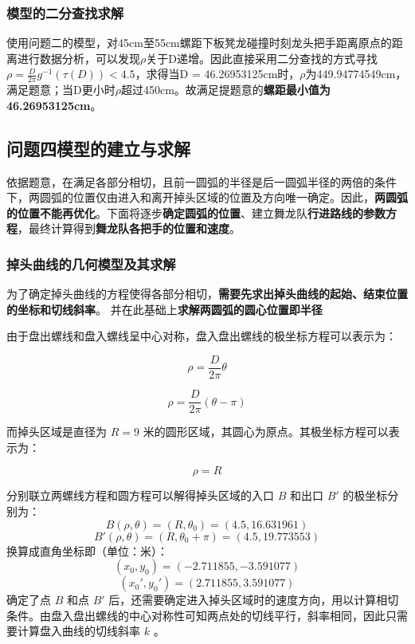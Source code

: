 \documentclass[a4paper]{article}
\begin{document}
        \subsubsection{模型的二分查找求解}
        使用问题二的模型，对45cm至55cm螺距下板凳龙碰撞时刻龙头把手距离原点的距离进行数据分析，可以发现$\rho$关于D递增。因此直接采用二分查找的方式寻找$\rho = \frac{D}{2 \pi} g^{-1}(\tau(D))< 4.5$，求得当D = 46.26953125cm时，$\rho$为449.94774549cm，满足题意；当D更小时$\rho$超过450cm。故满足提题意的\textbf{螺距最小值为46.26953125cm}。
	\subsection{问题四模型的建立与求解}

		依据题意，在满足各部分相切，且前一圆弧的半径是后一圆弧半径的两倍的条件下，两圆弧的位置仅由进入和离开掉头区域的位置及方向唯一确定。因此，\textbf{两圆弧的位置不能再优化}。下面将逐步\textbf{确定圆弧的位置}、建立舞龙队\textbf{行进路线的参数方程}，最终计算得到\textbf{舞龙队各把手的位置和速度}。%

		\subsubsection{掉头曲线的几何模型及其求解}

		为了确定掉头曲线的方程使得各部分相切，\textbf{需要先求出掉头曲线的起始、结束位置的坐标和切线斜率}。
		并在此基础上\textbf{求解两圆弧的圆心位置即半径}

		由于盘出螺线和盘入螺线呈中心对称，盘入盘出螺线的极坐标方程可以表示为：

		\begin{equation}
			\rho = \frac{D}{2\pi} \theta
		\end{equation}

		\begin{equation}
			\rho = \frac{D}{2\pi} (\theta - \pi)
		\end{equation}

		而掉头区域是直径为 $R = 9$ 米的圆形区域，其圆心为原点。其极坐标方程可以表示为：

		\begin{equation}
			\rho = R
		\end{equation}

		分别联立两螺线方程和圆方程可以解得掉头区域的入口 $B$ 和出口 $B'$ 的极坐标分别为：
		$$ B(\rho, \theta) = (R, \theta_0) = (4.5, 16.631961) $$
		$$ B'(\rho, \theta) = (R, \theta_0 + \pi) = (4.5, 19.773553)$$
		换算成直角坐标即（单位：米）：
		$$ (x_0, y_0) = (-2.711855, -3.591077) $$
		$$ (x_0', y_0') = (2.711855, 3.591077) $$
		确定了点 $B$ 和点 $B'$ 后，还需要确定进入掉头区域时的速度方向，用以计算相切条件。由盘入盘出螺线的中心对称性可知两点处的切线平行，斜率相同，因此只需要计算盘入曲线的切线斜率 $k$ 。
\end{document}
